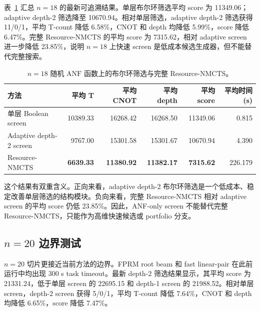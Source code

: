\documentclass[UTF8,fontset=macnew,11pt]{ctexart}
\newcommand{\method}{Resource-NMCTS}
\newcommand{\anf}{\ensuremath{\mathrm{ANF}}}
\begin{document}
表~\ref{tab:n18} 汇总 $n=18$ 的最新可追溯结果。单层布尔环筛选平均 score 为 11349.06；adaptive depth-2 筛选降至 10670.94。相对单层筛选，adaptive depth-2 筛选获得 11/0/1，平均 T-count 降低 6.58\%，CNOT 和 depth 均降低 5.99\%，score 降低 6.47\%。完整 \method{} 的平均 score 为 7315.62，相对 adaptive screen 进一步降低 23.85\%，说明 $n=18$ 上快速 screen 是低成本候选生成器，但不能替代完整搜索。

\begin{table}[t]
\centering
\small
\caption{$n=18$ 随机 \anf{} 函数上的布尔环筛选与完整 \method{}。}
\label{tab:n18}
\begin{tabular}{lrrrrr}
\toprule
方法 & 平均 T & 平均 CNOT & 平均 depth & 平均 score & 平均时间(s) \\
\midrule
单层 Boolean screen & 10389.33 & 16268.42 & 16268.50 & 11349.06 & 0.815 \\
Adaptive depth-2 screen & 9767.00 & 15301.58 & 15301.67 & 10670.94 & 4.390 \\
\method{} & \textbf{6639.33} & \textbf{11380.92} & \textbf{11382.17} & \textbf{7315.62} & 226.179 \\
\bottomrule
\end{tabular}
\end{table}

这个结果有双重含义。正向来看，adaptive depth-2 布尔环筛选是一个低成本、稳定改善单层筛选的结构模块。负向来看，完整 \method{} 相对 adaptive screen 的平均 score 仍低 23.85\%。因此，ANF-only screen 不能替代完整 Resource-NMCTS，只能作为高维快速候选或 portfolio 分支。

\subsection{\texorpdfstring{$n=20$}{n=20} 边界测试}

$n=20$ 切片更接近当前方法的边界。FPRM root beam 和 fast linear-pair 在此前运行中均出现 300 s task timeout。最新 depth-2 筛选结果显示，其平均 score 为 21331.24，低于单层 screen 的 22695.15 和 depth-1 screen 的 21988.52。相对单层 screen，depth-2 screen 获得 5/0/1，平均 T-count 降低 7.64\%，CNOT 和 depth 均降低 6.65\%，score 降低 7.47\%。
\end{document}
